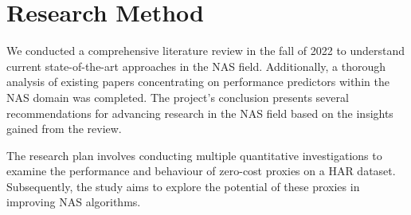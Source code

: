 \section{Research Method}
We conducted a comprehensive literature review in the fall of 2022 to understand current state-of-the-art approaches in the \gls{NAS} field. Additionally, a thorough analysis of existing papers concentrating on performance predictors within the \gls{NAS} domain was completed. The project's conclusion presents several recommendations for advancing research in the \gls{NAS} field based on the insights gained from the review.

The research plan involves conducting multiple quantitative investigations to examine the performance and behaviour of zero-cost proxies on a \gls{HAR} dataset. Subsequently, the study aims to explore the potential of these proxies in improving \gls{NAS} algorithms.


